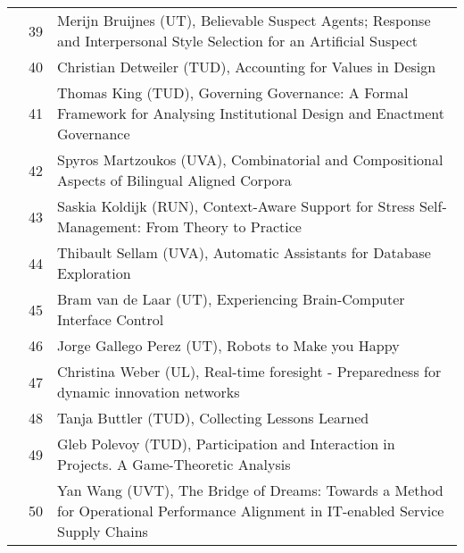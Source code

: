 \begin{longtabu}{@{}l@{ }l@{\hspace{1em}}X}
	&	 39	&	 Merijn Bruijnes (UT), Believable Suspect Agents; Response and Interpersonal Style Selection for an Artificial Suspect\\
	&	 40	&	 Christian Detweiler (TUD), Accounting for Values in Design\\
	&	 41	&	 Thomas King (TUD), Governing Governance: A Formal Framework for Analysing Institutional Design and Enactment Governance\\
	&	 42	&	 Spyros Martzoukos (UVA), Combinatorial and Compositional Aspects of Bilingual Aligned Corpora\\
	&	 43	&	 Saskia Koldijk (RUN), Context-Aware Support for Stress Self-Management: From Theory to Practice\\
	&	 44 &	 Thibault Sellam (UVA), Automatic Assistants for Database Exploration\\
	&	 45	&	 Bram van de Laar (UT), Experiencing Brain-Computer Interface Control\\
	&	 46	&	 Jorge Gallego Perez (UT), Robots to Make you Happy\\
	&	 47	&	 Christina Weber (UL), Real-time foresight - Preparedness for dynamic innovation networks\\
	&	 48	&	 Tanja Buttler (TUD), Collecting Lessons Learned\\
	&	 49	&	 Gleb Polevoy (TUD), Participation and Interaction in Projects. A Game-Theoretic Analysis\\
	&	 50	&	 Yan Wang (UVT), The Bridge of Dreams: Towards a Method for Operational Performance Alignment in IT-enabled Service Supply Chains\\


\end{longtabu}
